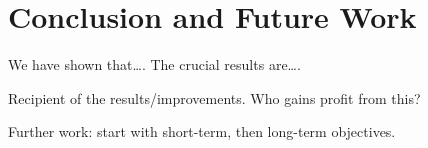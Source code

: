 \section{Conclusion and Future Work}\label{sec:conclusions}




We have shown that\dots. The crucial results are\dots.

Recipient of the results/improvements. Who gains profit from this?

Further work: start with short-term, then long-term objectives.